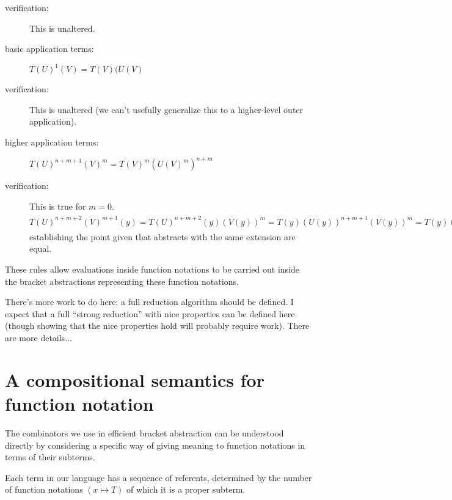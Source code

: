 \documentclass{article}
\begin{document}
\begin{description}
\item[verification:]  This is unaltered.

\item[basic application terms:]  $T(U)^1(V) = T(V)(U(V)$

\item[verification:] This is unaltered (we can't usefully generalize
this to a higher-level outer application).

\item[higher application terms:] $T(U)^{n+m+1}(V)^m =
  T(V)^m(U(V)^m)^{n+m}$

\item[verification:] This is true for $m=0$.
$T(U)^{n+m+2}(V)^{m+1}(y) = T(U)^{n+m+2}(y)(V(y))^{m} =
T(y)(U(y))^{n+m+1}(V(y))^m = T(y)(V(y))^m(U(y)(V(y))^m)^{n+m} =
T(V)^{m+1}(y)(U(V)^{m+1}(y))^{n+m} = T(V)^{m+1}(U(V)^{m+1})^{n+m+1}(y)$
establishing the point given that abstracts with the same extension
are equal.

\end{description}

These rules allow evaluations inside function notations to be carried
out inside the bracket abstractions representing these function notations.

There's more work to do here:  a full reduction algorithm should be defined.
I expect that a full ``strong reduction'' with nice properties can be defined
here (though showing that the nice properties hold will probably require work).
There are more details...

\section{A compositional semantics for function notation}

The combinators we use in efficient bracket abstraction can be understood
directly by considering a specific way of giving meaning to function notations
in terms of their subterms.

Each term in our language has a sequence of referents, determined by the
number of function notations $(x \mapsto T)$ of which it is a proper subterm.
\end{document}

